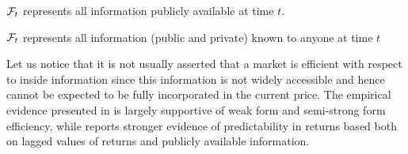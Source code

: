 \begin{definition}
	$\mathcal{F}_t$ represents all information publicly available at time $t$. 
\end{definition}

\begin{definition}
	$\mathcal{F}_t$ represents all information (public and private) known to anyone at time $t$	
\end{definition}
Let us notice that it is not usually asserted that a market is efficient with respect to inside information since this information is not widely accessible and hence cannot be expected to be fully incorporated in the current price. The empirical evidence presented in \cite{malkiel1970efficient} is largely supportive of weak form and semi-strong form efficiency, while \cite{fama1991efficient} reports stronger evidence of predictability in returns based both on lagged values of returns and publicly available information.


